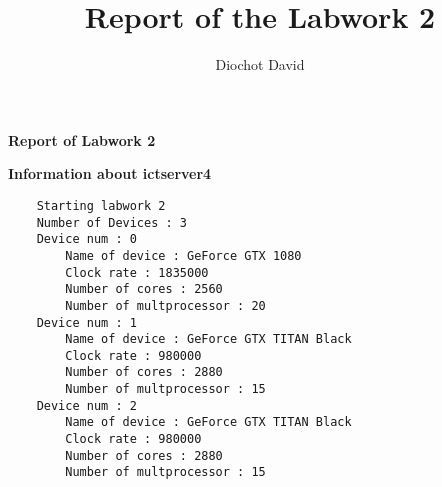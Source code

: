 \documentclass[a4paper]{article}
\title{Report of the Labwork 2}
\author{Diochot David}
\begin{document}
\begin{center}
    { \huge \bfseries Report of Labwork 2 \\[0.4cm] }
\end{center}


\bfseries Information about ictserver4

\begin{verbatim}
    Starting labwork 2
    Number of Devices : 3
    Device num : 0
        Name of device : GeForce GTX 1080
        Clock rate : 1835000
        Number of cores : 2560
        Number of multprocessor : 20
    Device num : 1
        Name of device : GeForce GTX TITAN Black
        Clock rate : 980000
        Number of cores : 2880
        Number of multprocessor : 15
    Device num : 2
        Name of device : GeForce GTX TITAN Black
        Clock rate : 980000
        Number of cores : 2880
        Number of multprocessor : 15

\end{verbatim}
\end{document}
